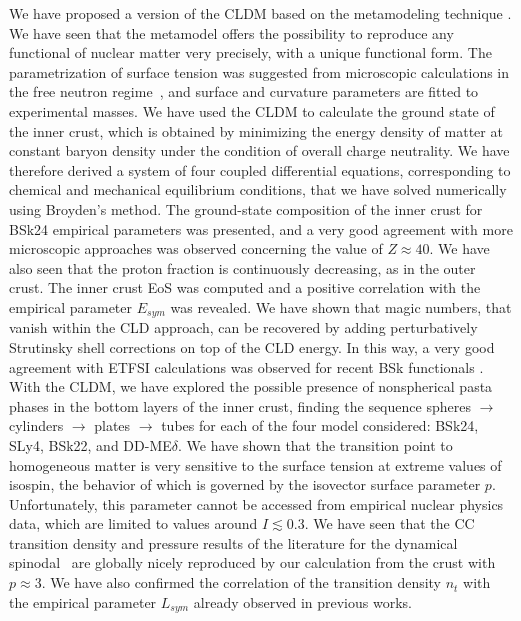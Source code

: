 We have proposed a version of the CLDM based on the metamodeling
technique \cite{Margueron2018a,Margueron2018b}. We have seen that the
metamodel offers the possibility to reproduce any functional of nuclear matter 
very precisely, {with a unique functional form}. The parametrization of 
surface tension was suggested from
microscopic calculations in the free neutron regime~\cite{Ravenhall1983}, and
surface and curvature parameters are fitted to experimental masses. We have used 
the CLDM to calculate the ground state of the inner crust, which is obtained by
minimizing the energy density of matter at constant baryon density under the
condition of overall charge neutrality. We have therefore derived a system of
four coupled differential equations, corresponding to chemical and mechanical
equilibrium conditions, that we have solved numerically using Broyden's method.
The ground-state composition of the inner crust for BSk24 empirical parameters 
was presented, and a very good agreement with more microscopic approaches was 
observed concerning the value of $Z \approx 40$. We have also seen that the 
proton fraction is continuously decreasing, as in the outer crust. The inner
crust EoS was computed and a positive correlation with the empirical 
parameter $E_{sym}$ was revealed. We have shown that magic numbers, that vanish
within the CLD approach, can be recovered by adding perturbatively Strutinsky
shell corrections on top of the CLD energy. In this way, a very good agreement 
with ETFSI calculations was observed for recent BSk 
functionals \cite{Pearson2018}. With the CLDM, we have explored the possible 
presence of nonspherical pasta phases in the bottom layers of the inner crust,
finding the sequence spheres $\rightarrow$ cylinders $\rightarrow$ plates
$\rightarrow$ tubes for each of the four model considered: BSk24, SLy4, BSk22,
and DD-ME$\delta$. We have shown that the transition point to homogeneous
matter is very sensitive to the surface tension at extreme values of isospin, 
the behavior of which is governed by the isovector surface parameter $p$.
Unfortunately, this parameter cannot be accessed from empirical nuclear physics 
data, which are limited to values around $I \lesssim 0.3$. We have seen that 
the CC transition density and pressure results of the literature for the 
dynamical spinodal~\cite{Ducoin2011} are globally nicely reproduced by our 
calculation from the crust with $p \approx 3$. We have also confirmed
the correlation of the transition density $n_t$ with the empirical parameter
$L_{sym}$ already observed in previous works.

